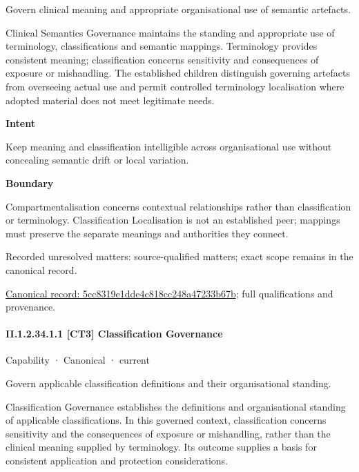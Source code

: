 Govern clinical meaning and appropriate organisational use of semantic artefacts.



Clinical Semantics Governance maintains the standing and appropriate use of terminology, classifications and semantic mappings. Terminology provides consistent meaning; classification concerns sensitivity and consequences of exposure or mishandling. The established children distinguish governing artefacts from overseeing actual use and permit controlled terminology localisation where adopted material does not meet legitimate needs.



\textbf{Intent}



Keep meaning and classification intelligible across organisational use without concealing semantic drift or local variation.



\textbf{Boundary}



Compartmentalisation concerns contextual relationships rather than classification or terminology. Classification Localisation is not an established peer; mappings must preserve the separate meanings and authorities they connect.


{\small Recorded unresolved matters: source-qualified matters; exact scope remains in the canonical record.}\par
{\footnotesize \href{../../../../continuum/strategy/capability/5cc8319e1dde4c818cc248a47233b67b.md}{Canonical record: 5cc8319e1dde4c818cc248a47233b67b}; full qualifications and provenance.}\par
\paragraph*{II.1.2.34.1.1 [CT3] Classification Governance}
\label{navigation:II.1.2.34.1.1}

\label{element:4520ce37454e4de68580d75fdb08efe6}
{\small Capability · Canonical · current}\par

Govern applicable classification definitions and their organisational standing.



Classification Governance establishes the definitions and organisational standing of applicable classifications. In this governed context, classification concerns sensitivity and the consequences of exposure or mishandling, rather than the clinical meaning supplied by terminology. Its outcome supplies a basis for consistent application and protection considerations.



